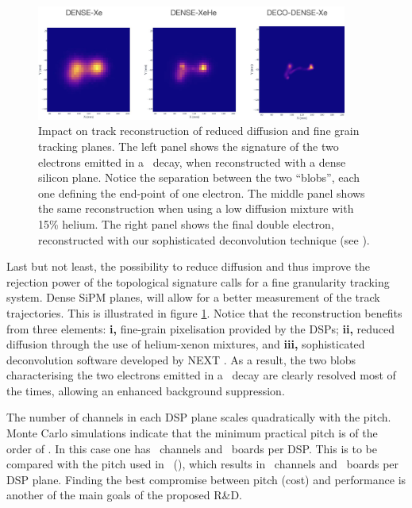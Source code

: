 \begin{figure}[htbp!]
  \begin{center}
      \includegraphics[width=0.91\textwidth]{img2/tracks.jpg}
    \caption{Impact on track reconstruction of reduced diffusion and fine grain tracking planes. The left panel shows the signature of the two electrons emitted in a \bb\ decay, when reconstructed with a dense silicon plane. Notice the separation between the two ``blobs'', each one defining the end-point of one electron. The middle panel shows the same reconstruction when using a low diffusion mixture with 15\% helium. The right panel shows the final double electron, reconstructed with our sophisticated deconvolution technique (see \cite{NEXT:2020jmz}).} 
    \label{fig.DSP}
  \end{center}
\end{figure}


Last but not least, the possibility to reduce diffusion and thus improve the rejection power of the topological signature calls for a fine granularity tracking system. Dense SiPM planes, will allow for a better measurement of the track trajectories. This  is illustrated in figure  \ref{fig.DSP}. 
Notice that the reconstruction benefits from three elements: {\bf i,} fine-grain pixelisation provided by the DSPs;  {\bf ii,} reduced diffusion through the use of  helium-xenon mixtures, and {\bf iii,} sophisticated deconvolution software developed by NEXT \cite{NEXT:2020jmz}.  As a result, the two blobs characterising the two electrons emitted in a \bb\ decay are clearly resolved most of the times, allowing an enhanced background suppression. 


The number of channels in each DSP plane scales quadratically with the pitch. Monte Carlo simulations indicate that the minimum practical pitch is of the order of 
\DSPMNP. In this case one has \DSPMNPC\ channels and \DSPMNPB\ boards per DSP. This is to be compared with the pitch used in \NEW\ (\DSPMXP), 
which results in \DSPMXPC\ channels and \DSPMXPB\ boards per DSP plane. Finding the best compromise between pitch (cost) and performance is another of the main goals of the proposed R\&D.

